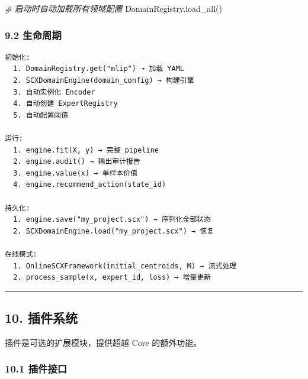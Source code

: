 \documentclass[
  12pt,
]{ctexart}
\newenvironment{Shaded}{}{}
\newcommand{\CommentTok}[1]{\textcolor[rgb]{0.38,0.63,0.69}{\textit{#1}}}
\newcommand{\NormalTok}[1]{#1}
\begin{document}
\begin{Shaded}
\begin{Highlighting}[]
\CommentTok{\# 启动时自动加载所有领域配置}
\NormalTok{DomainRegistry.load\_all()}
\end{Highlighting}
\end{Shaded}

\subsubsection{9.2 生命周期}\label{ux751fux547dux5468ux671f}

\begin{verbatim}
初始化:
  1. DomainRegistry.get("mlip") → 加载 YAML
  2. SCXDomainEngine(domain_config) → 构建引擎
  3. 自动实例化 Encoder
  4. 自动创建 ExpertRegistry
  5. 自动配置阈值

运行:
  1. engine.fit(X, y) → 完整 pipeline
  2. engine.audit() → 输出审计报告
  3. engine.value(x) → 单样本价值
  4. engine.recommend_action(state_id)

持久化:
  1. engine.save("my_project.scx") → 序列化全部状态
  2. SCXDomainEngine.load("my_project.scx") → 恢复

在线模式:
  1. OnlineSCXFramework(initial_centroids, M) → 流式处理
  2. process_sample(x, expert_id, loss) → 增量更新
\end{verbatim}

\begin{center}\rule{0.5\linewidth}{0.5pt}\end{center}

\subsection{10. 插件系统}\label{ux63d2ux4ef6ux7cfbux7edf}

插件是可选的扩展模块，提供超越 Core 的额外功能。

\subsubsection{10.1 插件接口}\label{ux63d2ux4ef6ux63a5ux53e3}
\end{document}
